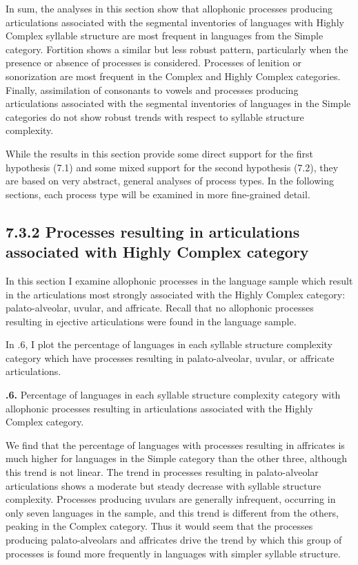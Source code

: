   In sum, the analyses in this section show that allophonic processes producing articulations associated with the segmental inventories of languages with Highly Complex syllable structure are most frequent in languages from the Simple category. Fortition shows a similar but less robust pattern, particularly when the presence or absence of processes is considered. Processes of lenition or sonorization are most frequent in the Complex and Highly Complex categories. Finally, assimilation of consonants to vowels and processes producing articulations associated with the segmental inventories of languages in the Simple categories do not show robust trends with respect to syllable structure complexity.



  While the results in this section provide some direct support for the first hypothesis (7.1) and some mixed support for the second hypothesis (7.2), they are based on very abstract, general analyses of process types. In the following sections, each process type will be examined in more fine-grained detail.


\subsection{7.3.2 Processes resulting in articulations associated with Highly Complex category}

  In this section I examine allophonic processes in the language sample which result in the articulations most strongly associated with the Highly Complex category: palato-alveolar, uvular, and affricate. Recall that no allophonic processes resulting in ejective articulations were found in the language sample.



  In .6, I plot the percentage of languages in each syllable structure complexity category which have processes resulting in palato-alveolar, uvular, or affricate articulations.





\textbf{.6.} Percentage of languages in each syllable structure complexity category with allophonic processes resulting in articulations associated with the Highly Complex category.



  We find that the percentage of languages with processes resulting in affricates is much higher for languages in the Simple category than the other three, although this trend is not linear. The trend in processes resulting in palato-alveolar articulations shows a moderate but steady decrease with syllable structure complexity. Processes producing uvulars are generally infrequent, occurring in only seven languages in the sample, and this trend is different from the others, peaking in the Complex category. Thus it would seem that the processes producing palato-alveolars and affricates drive the trend by which this group of processes is found more frequently in languages with simpler syllable structure.



